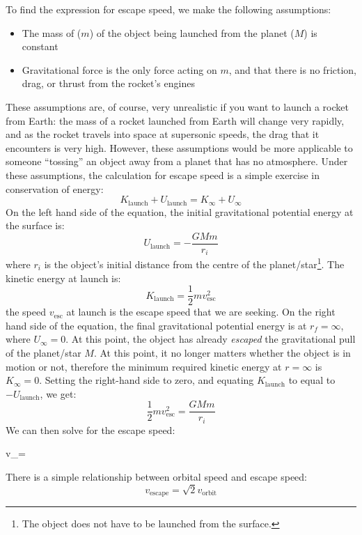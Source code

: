To find the expression for escape speed, we make the following assumptions:
\begin{itemize}[itemsep=6pt]
\item The mass of ($m$) of the object being launched from the planet ($M$) is
  constant
\item Gravitational force is the only force acting on $m$, and that there is
  no friction, drag, or thrust from the rocket's engines
\end{itemize}
These assumptions are, of course, very unrealistic if you want to launch a
rocket from Earth: the mass of a rocket launched from Earth will change very
rapidly, and as the rocket travels into space at supersonic speeds, the drag
that it encounters is very high. However, these assumptions would be more
applicable to someone ``tossing'' an object away from a planet that has no
atmosphere. Under these assumptions, the calculation for escape speed is a
simple exercise in conservation of energy:
\begin{equation}
  K_\text{launch} + U_\text{launch} = K_\infty + U_\infty
\end{equation}
On the left hand side of the equation, the initial gravitational potential
energy at the surface is:
\begin{equation}
  U_\text{launch}=-\frac{GMm}{r_i}
\end{equation}
where $r_i$ is the object's initial distance from the centre of the
planet/star\footnote{The object does not have to be launched from the
surface.}. The kinetic energy at launch is:
\begin{equation}
  K_\text{launch}=\frac12mv_\text{esc}^2
\end{equation}
the speed $v_\text{esc}$ at launch is the escape speed that we are seeking. On
the right hand side of the equation, the final gravitational potential energy
is at $r_f=\infty$, where $U_\infty=0$. At this point, the object has already
\emph{escaped} the gravitational pull of the planet/star $M$. At this point, it
no longer matters whether the object is in motion or not, therefore the minimum
required kinetic energy at $r=\infty$ is $K_\infty=0$. Setting the right-hand
side to zero, and equating $K_\text{launch}$ to equal to $-U_\text{launch}$, we
get:
\begin{equation}
  \frac12mv_\text{esc}^2=\frac{GMm}{r_i}
\end{equation}
We can then solve for the escape speed:
\begin{important-equation}
  v_=
  \label{eq:escape-speed}
\end{important-equation}
There is a simple relationship between orbital speed and escape speed:
\begin{equation}
  v_\text{escape}=\sqrt2v_\text{orbit}
\end{equation}

